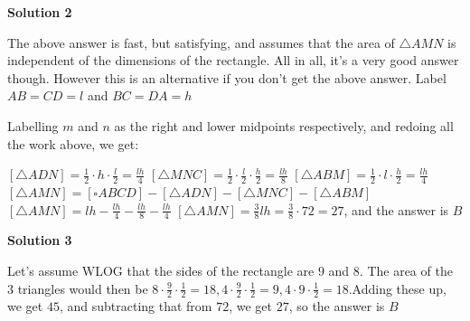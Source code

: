 \begin{enumerate}
 



\textbf{Solution 2}

The above answer is fast, but satisfying, and assumes that the area of $\triangle AMN$ is independent of the dimensions of the rectangle. All in all, it's a very good answer though. However this is an alternative if you don't get the above answer. Label $AB = CD = l$ and $BC = DA = h$

 Labelling $m$ and $n$ as the right and lower midpoints respectively, and redoing all the work above, we get:

 $[\triangle ADN] = \frac{1}{2}\cdot h\cdot \frac{l}{2} = \frac{lh}{4}$
$[\triangle MNC] = \frac{1}{2}\cdot \frac{l}{2}\cdot \frac{h}{2} = \frac{lh}{8}$
$[\triangle ABM] = \frac{1}{2}\cdot l\cdot \frac{h}{2} = \frac{lh}{4}$
$[\triangle AMN] = [\square ABCD] - [\triangle ADN] - [\triangle MNC] - [\triangle ABM]$
$[\triangle AMN] = lh - \frac{lh}{4} - \frac{lh}{8} - \frac{lh}{4}$
$[\triangle AMN] = \frac{3}{8}lh = \frac{3}{8}\cdot 72 = 27$, and the answer is $\boxed{B}$




\textbf{Solution 3}

Let's assume WLOG that the sides of the rectangle are $9$ and $8.$ The area of the 3 triangles would then be $8\cdot\frac{9}{2}\cdot\frac{1}{2} = 18,$$4\cdot\frac{9}{2}\cdot\frac{1}{2} = 9,$$4\cdot 9\cdot\frac{1}{2} = 18.$Adding these up, we get $45$, and subtracting that from $72$, we get $27$, so the answer is $\boxed{B}$



\end{enumerate}